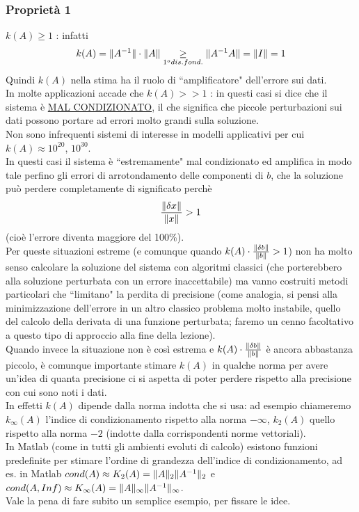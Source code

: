 \documentclass[12pt,a4paper]{article}
\DeclarePairedDelimiter{\norma}{\lVert}{\rVert}
\begin{document}
\subsubsection{Proprietà 1}
$k(A)\geq1$ : infatti
\begin{equation*}
    k(A)=\norma{A^{-1}}\cdot\norma{A}\underset{1^o dis. fond.}{\geq}\norma{A^{-1}A}=\norma{I}=1
\end{equation*}
Quindi $k(A)$ nella stima ha il ruolo di ``amplificatore" dell'errore sui dati.\\ In molte applicazioni accade che $k(A)>>1$ : in questi casi si dice che il sistema è \uline{MAL CONDIZIONATO}, il che significa che piccole perturbazioni sui dati possono portare ad errori molto grandi sulla soluzione.\\
Non sono infrequenti sistemi di interesse in modelli applicativi per cui $k(A)\approx10^{20}$, $10^{30}$.\\In questi casi il sistema è ``estremamente" mal condizionato ed amplifica in modo tale perfino gli errori di arrotondamento delle componenti di $b$, che la soluzione può perdere completamente di significato perchè
\begin{equation*}
    \frac{\norma{\delta x}}{\norma{x}}>1
\end{equation*}
(cioè l'errore diventa maggiore del 100\%).\\Per queste situazioni estreme (e comunque quando $k(A)\cdot\frac{\norma{\delta b}}{\norma{b}}>1$) non ha molto senso calcolare la soluzione del sistema con algoritmi classici (che porterebbero alla soluzione perturbata con un errore inaccettabile) ma vanno costruiti metodi particolari che ``limitano" la perdita di precisione (come analogia, si pensi alla minimizzazione dell'errore in un altro classico problema molto instabile, quello del calcolo della derivata di una funzione perturbata; faremo un cenno facoltativo a questo tipo di approccio alla fine della lezione).\\Quando invece la situazione non è così estrema e $k(A)\cdot\frac{\norma{\delta b}}{\norma{b}}$ è ancora abbastanza piccolo, è comunque importante stimare $k(A)$ in qualche norma per avere un'idea di quanta precisione ci si aspetta di poter perdere rispetto alla precisione con cui sono noti i dati.\\In effetti $k(A)$ dipende dalla norma indotta che si usa: ad esempio chiameremo $k_\infty(A)$ l'indice di condizionamento rispetto alla norma $-\infty$, $k_2(A)$ quello rispetto alla norma $-2$ (indotte dalla corrispondenti norme vettoriali).\\In Matlab (come in tutti gli ambienti evoluti di calcolo) esistono funzioni predefinite per stimare l'ordine di grandezza dell'indice di condizionamento, ad es. in Matlab $cond(A) \approx K_2(A) = \norma{A}_2 \norma{A^{-1}}_2$ e $cond(A,Inf) \approx K_\infty(A) = \norma{A}_\infty \norma{A^{-1}}_\infty$.\\
Vale la pena di fare subito un semplice esempio, per fissare le idee.
\end{document}
